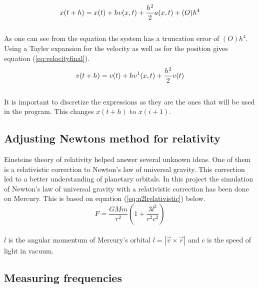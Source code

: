 \documentclass{article}
\begin{document}
    \begin{equation}    \label{eq:positionfinal}
        x(t+h) = x(t) + h v(x,t) + \frac{h^{2}}{2} a(x,t) + (O)h^{4} \\
    \end{equation} \\

    As one can see from the equation the system has a truncation error of $(O)h^{4}$. \\

    Using a Tayler expansion for the velocity as well as for the position gives equation (\ref{eq:velocityfinal}). \\

    \begin{equation}    \label{eq:velocityfinal}
        v(t+h) = v(t) + h v^{1}(x,t) + \frac{h^{2}}{2}v(t) \\
    \end{equation} \\

    It is important to discretize the expressions as they are the ones that will be used in the program. This changes $x(t+h)$ to $x(i+1)$. \\

\subsection{Adjusting Newtons method for relativity}

    Einsteins theory of relativity helped answer several unknown ideas. One of them is a relativistic correction to Newton's law of universal gravity. This correction led to a better understanding of planetary orbitals. In this project the simulation of Newton's law of universal gravity with a relativistic correction has been done on Mercury. This is based on equation (\ref{eq:n2lrelativistic}) below. \\

    \begin{equation}    \label{eq:n2lrelativistic}
        F = \frac{GMm}{r^2} (1+\frac{3l^2}{r^2c^2})
    \end{equation} \\

    $l$ is the angular momentum of Mercury's orbital $l = |\vec{v} \times \vec{r}|$ and $c$ is the speed of light in vacuum.

\subsection{Measuring frequencies} \label{sec:frequencies}
\end{document}
